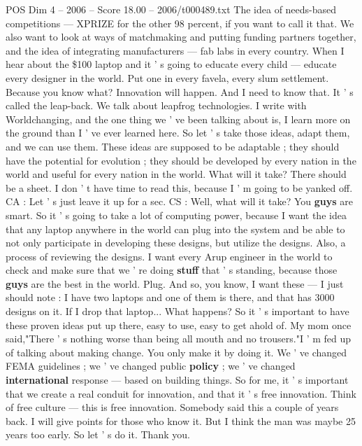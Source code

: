 \begin{textsample}{POS Dim 4 – 2006 – Score 18.00 – 2006/t000489.txt}
The idea of needs-based competitions — XPRIZE for the other 98 percent, if you want to call it that.
We also want to look at ways of matchmaking and putting funding partners together, and the idea of integrating manufacturers — fab labs in every country.
When I hear about the \$100 laptop and it ' s going to educate every child — educate every designer in the world.
Put one in every favela, every slum settlement.
Because you know what?
Innovation will happen.
And I need to know that.
It ' s called the leap-back.
We talk about leapfrog technologies.
I write with Worldchanging, and the one thing we ' ve been talking about is, I learn more on the ground than I ' ve ever learned here.
So let ' s take those ideas, adapt them, and we can use them.
These ideas are supposed to be adaptable ; they should have the potential for evolution ; they should be developed by every nation in the world and useful for every nation in the world.
What will it take?
There should be a sheet.
I don ' t have time to read this, because I ' m going to be yanked off.
CA : Let ' s just leave it up for a sec.
CS : Well, what will it take?
You \textbf{guys} are smart.
So it ' s going to take a lot of computing power, because I want the idea that any laptop anywhere in the world can plug into the system and be able to not only participate in developing these designs, but utilize the designs.
Also, a process of reviewing the designs.
I want every Arup engineer in the world to check and make sure that we ' re doing \textbf{stuff} that ' s standing, because those \textbf{guys} are the best in the world.
Plug.
And so, you know, I want these — I just should note : I have two laptops and one of them is there, and that has 3000 designs on it.
If I drop that laptop...
What happens?
So it ' s important to have these proven ideas put up there, easy to use, easy to get ahold of.
My mom once said,"There ' s nothing worse than being all mouth and no trousers."I ' m fed up of talking about making change.
You only make it by doing it.
We ' ve changed FEMA guidelines ; we ' ve changed public \textbf{policy} ; we ' ve changed \textbf{international} response — based on building things.
So for me, it ' s important that we create a real conduit for innovation, and that it ' s free innovation.
Think of free culture — this is free innovation.
Somebody said this a couple of years back.
I will give points for those who know it.
But I think the man was maybe 25 years too early.
So let ' s do it.
Thank you.

\end{textsample}
